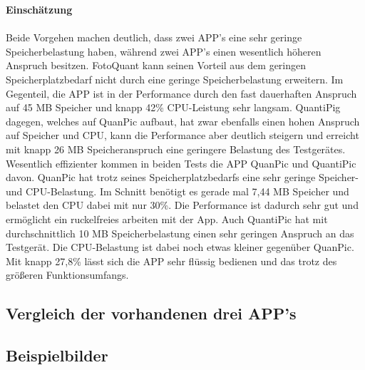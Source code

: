 \textbf{Einschätzung}
\\
\\
Beide Vorgehen machen deutlich, dass zwei APP’s eine sehr geringe Speicherbelastung haben, während zwei APP’s einen wesentlich höheren Anspruch besitzen. FotoQuant kann seinen Vorteil aus dem geringen Speicherplatzbedarf nicht durch eine geringe Speicherbelastung erweitern. Im Gegenteil, die APP ist in der Performance durch den fast dauerhaften Anspruch auf 45 MB Speicher und knapp 42\% CPU-Leistung sehr langsam. QuantiPig dagegen, welches auf QuanPic aufbaut, hat zwar ebenfalls einen hohen Anspruch auf Speicher und CPU, kann die Performance aber deutlich steigern und erreicht mit knapp 26 MB Speicheranspruch eine geringere Belastung des Testgerätes. 
Wesentlich effizienter kommen in beiden Tests die APP QuanPic und QuantiPic davon. QuanPic hat trotz seines Speicherplatzbedarfs eine sehr geringe Speicher- und CPU-Belastung. Im Schnitt benötigt es gerade mal 7,44 MB Speicher und belastet den CPU dabei mit nur 30\%. Die Performance ist dadurch sehr gut und ermöglicht ein ruckelfreies arbeiten mit der App. Auch QuantiPic hat mit durchschnittlich 10 MB Speicherbelastung einen sehr geringen Anspruch an das Testgerät. Die CPU-Belastung ist dabei noch etwas kleiner gegenüber QuanPic. Mit knapp 27,8\% lässt sich die APP sehr flüssig bedienen und das trotz des größeren Funktionsumfangs.




\subsection{\textbf{Vergleich der vorhandenen drei \acs{APP}'s}}
\begin{landscape}

\newpage






\end{landscape}


\subsection{Beispielbilder}

